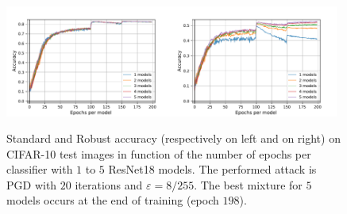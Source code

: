 \begin{figure}[!ht]
\begin{center}
\includegraphics[width=0.49\textwidth]{Images/5_standard_acc_finalrun_ResNet18_1024_200_0.001.pdf}\includegraphics[width=0.49\textwidth]{Images/5_robust_acc_finalrun_ResNet18_1024_200_0.001.pdf} 

\caption{Standard and Robust accuracy (respectively on  left and on right) on CIFAR-10 test images in function of the number of epochs per classifier with $1$ to $5$ ResNet18 models. The performed attack is PGD with $20$ iterations and $\varepsilon=8/255$. The best mixture for $5$ models occurs at the end of training (epoch $198$).}
\label{fig:overfitting}
\end{center}
\end{figure}

